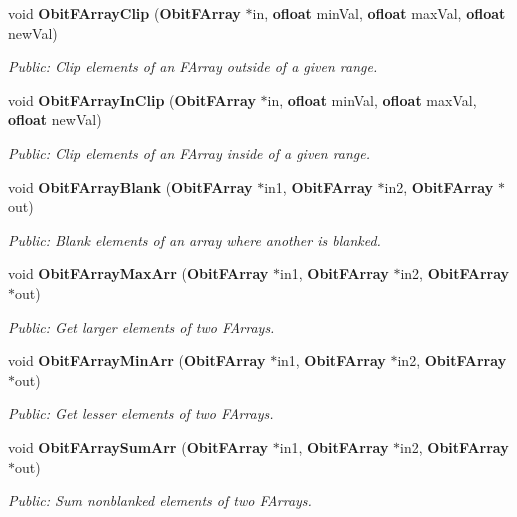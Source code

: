 \begin{CompactItemize}
void {\bf Obit\-FArray\-Clip} ({\bf Obit\-FArray} $\ast$in, {\bf ofloat} min\-Val, {\bf ofloat} max\-Val, {\bf ofloat} new\-Val)
\begin{CompactList}\small\item\em Public: Clip elements of an FArray outside of a given range. \item\end{CompactList}\item 
void {\bf Obit\-FArray\-In\-Clip} ({\bf Obit\-FArray} $\ast$in, {\bf ofloat} min\-Val, {\bf ofloat} max\-Val, {\bf ofloat} new\-Val)
\begin{CompactList}\small\item\em Public: Clip elements of an FArray inside of a given range. \item\end{CompactList}\item 
void {\bf Obit\-FArray\-Blank} ({\bf Obit\-FArray} $\ast$in1, {\bf Obit\-FArray} $\ast$in2, {\bf Obit\-FArray} $\ast$out)
\begin{CompactList}\small\item\em Public: Blank elements of an array where another is blanked. \item\end{CompactList}\item 
void {\bf Obit\-FArray\-Max\-Arr} ({\bf Obit\-FArray} $\ast$in1, {\bf Obit\-FArray} $\ast$in2, {\bf Obit\-FArray} $\ast$out)
\begin{CompactList}\small\item\em Public: Get larger elements of two FArrays. \item\end{CompactList}\item 
void {\bf Obit\-FArray\-Min\-Arr} ({\bf Obit\-FArray} $\ast$in1, {\bf Obit\-FArray} $\ast$in2, {\bf Obit\-FArray} $\ast$out)
\begin{CompactList}\small\item\em Public: Get lesser elements of two FArrays. \item\end{CompactList}\item 
void {\bf Obit\-FArray\-Sum\-Arr} ({\bf Obit\-FArray} $\ast$in1, {\bf Obit\-FArray} $\ast$in2, {\bf Obit\-FArray} $\ast$out)
\begin{CompactList}\small\item\em Public: Sum nonblanked elements of two FArrays. \item\end{CompactList}\item 

\end{CompactItemize}
